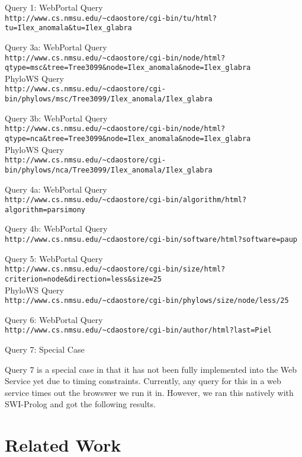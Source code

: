 \documentclass[10pt]{article}
\begin{document}
Query 1: WebPortal Query \\
{\tt http://www.cs.nmsu.edu/\~{}cdaostore/cgi-bin/tu/html?tu=Ilex\_anomala\&tu=Ilex\_glabra}

Query 3a: WebPortal Query \\
{\tt http://www.cs.nmsu.edu/\~{}cdaostore/cgi-bin/node/html?qtype=msc\&tree=Tree3099\&node=Ilex\_anomala\&node=Ilex\_glabra}
\\
PhyloWS Query\\
{\tt http://www.cs.nmsu.edu/\~{}cdaostore/cgi-bin/phylows/msc/Tree3099/Ilex\_anomala/Ilex\_glabra}

Query 3b: WebPortal Query \\
{\tt http://www.cs.nmsu.edu/\~{}cdaostore/cgi-bin/node/html?qtype=nca\&tree=Tree3099\&node=Ilex\_anomala\&node=Ilex\_glabra}
\\
PhyloWS Query\\
{\tt http://www.cs.nmsu.edu/\~{}cdaostore/cgi-bin/phylows/nca/Tree3099/Ilex\_anomala/Ilex\_glabra}

Query 4a: WebPortal Query \\
{\tt http://www.cs.nmsu.edu/\~{}cdaostore/cgi-bin/algorithm/html?algorithm=parsimony}

Query 4b: WebPortal Query \\
{\tt http://www.cs.nmsu.edu/\~{}cdaostore/cgi-bin/software/html?software=paup}

Query 5: WebPortal Query \\
{\tt http://www.cs.nmsu.edu/\~{}cdaostore/cgi-bin/size/html?criterion=node\&direction=less\&size=25}
\\
PhyloWS Query\\
{\tt http://www.cs.nmsu.edu/\~{}cdaostore/cgi-bin/phylows/size/node/less/25}

Query 6: WebPortal Query \\
{\tt http://www.cs.nmsu.edu/\~{}cdaostore/cgi-bin/author/html?last=Piel}

Query 7:  Special Case

Query 7 is a special case in that it has not been fully implemented into the
Web Service yet due to timing constraints.  Currently, any query for this in a
web service times out the browswer we run it in.  However, we ran this natively
with SWI-Prolog and got the following results.

\section{Related Work}
\end{document}

